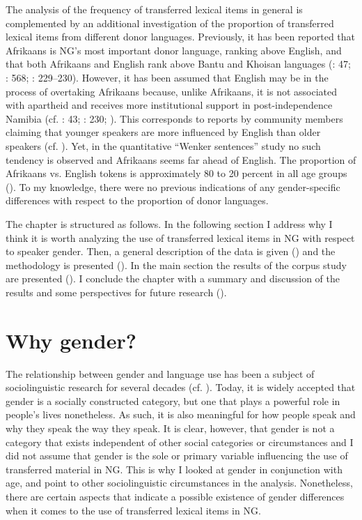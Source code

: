 \documentclass[output=paper]{langsci/langscibook}
\begin{document}
The analysis of the frequency of transferred lexical items in general is complemented by an additional investigation of the proportion of transferred lexical items from different donor languages. Previously, it has been reported that Afrikaans is NG’s most important donor language, ranking above English, and that both Afrikaans and English rank above Bantu and Khoisan languages (\citealt{nockler_sprachmischung_1963}: 47; \citealt{bohm_deutsch_2003}: 568; \citealt{kellermeier-rehbein_sprache_2016}: 229--230). However, it has been assumed that English may be in the process of overtaking Afrikaans because, unlike Afrikaans, it is not associated with apartheid and receives more institutional support in post-independence Namibia (cf. \citealt{shah_german_2007}: 43; \citealt{kellermeier-rehbein_sprache_2016}: 230; \citealt{zimmer_linguisticvar_toappear}). This corresponds to reports by community members claiming that younger speakers are more influenced by English than older speakers (cf. \citealt{zimmer_linguisticvar_toappear}). Yet, in the quantitative “Wenker sentences” study no such tendency is observed and Afrikaans seems far ahead of English. The proportion of Afrikaans vs. English tokens is approximately 80 to 20 percent in all age groups (\citealt{zimmer_linguisticvar_toappear}). To my knowledge, there were no previous indications of any gender-specific differences with respect to the proportion of donor languages.

The chapter is structured as follows. In the following section I address why I think it is worth analyzing the use of transferred lexical items in NG with respect to speaker gender. Then, a general description of the data is given () and the methodology is presented (). In the main section the results of the corpus study are presented (). I conclude the chapter with a summary and discussion of the results and some perspectives for future research ().

 
\section{Why gender?}
 \label{sec:bracke:2}
 \largerpage[2]

The relationship between gender and language use has been a subject of sociolinguistic research for several decades (cf. \citealt{coates_language_2011}). Today, it is widely accepted that gender is a socially constructed category, but one that plays a powerful role in people’s lives nonetheless. As such, it is also meaningful for how people speak and why they speak the way they speak. It is clear, however, that gender is not a category that exists independent of other social categories or circumstances \citep[65]{eckert_gender_2011} and I did not assume that gender is the sole or primary variable influencing the use of transferred material in NG. This is why I looked at gender in conjunction with age, and point to other sociolinguistic circumstances in the analysis. Nonetheless, there are certain aspects that indicate a possible existence of gender differences when it comes to the use of transferred lexical items in NG.
\end{document}
